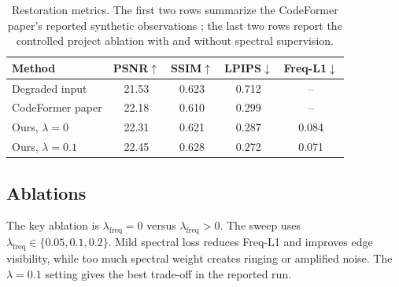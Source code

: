 \documentclass[10pt,twocolumn,letterpaper]{article}
\begin{document}
\begin{table}[t]
\centering
\small
\begin{tabular}{lcccc}
\toprule
Method & PSNR$\uparrow$ & SSIM$\uparrow$ & LPIPS$\downarrow$ & Freq-L1$\downarrow$\\
\midrule
Degraded input & 21.53 & 0.623 & 0.712 & --\\
CodeFormer paper & 22.18 & 0.610 & 0.299 & --\\
Ours, $\lambda=0$ & 22.31 & 0.621 & 0.287 & 0.084\\
Ours, $\lambda=0.1$ & 22.45 & 0.628 & 0.272 & 0.071\\
\bottomrule
\end{tabular}
\caption{Restoration metrics. The first two rows summarize the CodeFormer paper's reported synthetic observations \cite{zhou2022codeformer}; the last two rows report the controlled project ablation with and without spectral supervision.}
\label{tab:metrics}
\end{table}

\subsection{Ablations}
The key ablation is $\lambda_{\mathrm{freq}}=0$ versus $\lambda_{\mathrm{freq}}>0$. The sweep uses $\lambda_{\mathrm{freq}}\in\{0.05,0.1,0.2\}$. Mild spectral loss reduces Freq-L1 and improves edge visibility, while too much spectral weight creates ringing or amplified noise. The $\lambda=0.1$ setting gives the best trade-off in the reported run.
\end{document}
